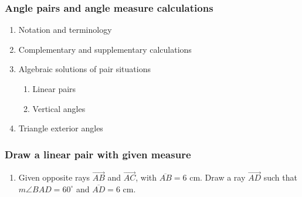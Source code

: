 \documentclass[12pt, twoside]{article}
\begin{document}
\subsubsection*{Angle pairs and angle measure calculations}
  \begin{enumerate}
  \item Notation and terminology
  \item Complementary and supplementary calculations
  \item Algebraic solutions of pair situations
  \begin{enumerate}
    \item Linear pairs
    \item Vertical angles
    \end{enumerate}
  \item Triangle exterior angles
  \end{enumerate}

\subsubsection*{Draw a linear pair with given measure}
  \begin{enumerate}
    \item Given opposite rays $\overrightarrow{AB}$ and $\overrightarrow{AC}$, with $\overline{AB}=6$ cm. Draw a ray $\overrightarrow{AD}$ such that $m \angle BAD=60^\circ$ and $\overline{AD}=6$ cm.
    \begin{center}
    \end{center}
  \end{enumerate}
\end{document}
